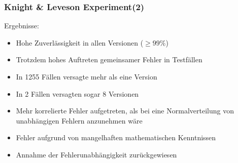 %
%
\begin{frame}
	\frametitle{ Knight \& Leveson Experiment(2)}
	
	Ergebnisse:
	\begin{itemize}
		\item Hohe Zuverlässigkeit in allen Versionen ($\geq 99\%$)
		\item Trotzdem hohes Auftreten gemeinsamer Fehler in Testfällen
		\item In 1255 Fällen versagte mehr als eine Version
		\item In 2 Fällen versagten sogar 8 Versionen
		\item Mehr korrelierte Fehler aufgetreten, als bei eine Normalverteilung von unabhängigen Fehlern anzunehmen wäre
		\item Fehler aufgrund von mangelhaften mathematischen Kenntnissen
		\item Annahme der Fehlerunabhängigkeit zurückgewiesen
		
	\end{itemize}
	
\end{frame}

